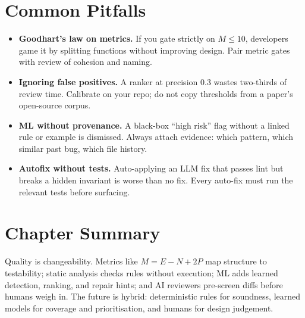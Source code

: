 \section{Common Pitfalls}\label{sec:quality-pitfalls}
\begin{itemize}[leftmargin=1.2em, itemsep=0.3em]
  \item \textbf{Goodhart's law on metrics.} If you gate strictly on $M\le10$, developers game it by splitting functions without improving design. Pair metric gates with review of cohesion and naming.
  \item \textbf{Ignoring false positives.} A ranker at precision $0.3$ wastes two-thirds of review time. Calibrate on your repo; do not copy thresholds from a paper's open-source corpus.
  \item \textbf{ML without provenance.} A black-box ``high risk'' flag without a linked rule or example is dismissed. Always attach evidence: which pattern, which similar past bug, which file history.
  \item \textbf{Autofix without tests.} Auto-applying an LLM fix that passes lint but breaks a hidden invariant is worse than no fix. Every auto-fix must run the relevant tests before surfacing.
\end{itemize}

\section{Chapter Summary}\label{sec:quality-summary}
Quality is changeability. Metrics like $M=E-N+2P$ map structure to testability; static analysis checks rules without execution; ML adds learned detection, ranking, and repair hints; and AI reviewers pre-screen diffs before humans weigh in. The future is hybrid: deterministic rules for soundness, learned models for coverage and prioritisation, and humans for design judgement.

